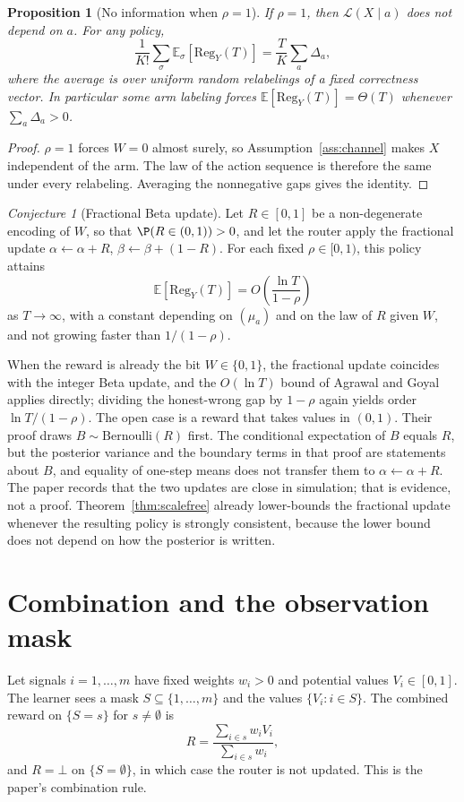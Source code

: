 \documentclass{article}
\newtheorem{proposition}[theorem]{Proposition}
\theoremstyle{definition}
\theoremstyle{remark}
\newtheorem{conjecture}[theorem]{Conjecture}
\newcommand{\E}{\mathbb{E}}
\newcommand{\Reg}{\mathrm{Reg}}
\begin{document}
\begin{proposition}[No information when $\rho=1$]\label{prop:linear}
If $\rho=1$, then $\mathcal L(X\mid a)$ does not depend on $a$. For any policy,
\[
\frac1{K!}\sum_{\sigma}\E_\sigma[\Reg_Y(T)]=\frac{T}{K}\sum_a\Delta_a,
\]
where the average is over uniform random relabelings of a fixed correctness vector. In particular some arm labeling forces $\E[\Reg_Y(T)]=\Theta(T)$ whenever $\sum_a\Delta_a>0$.
\end{proposition}

\begin{proof}
$\rho=1$ forces $W=0$ almost surely, so Assumption~\ref{ass:channel} makes $X$ independent of the arm. The law of the action sequence is therefore the same under every relabeling. Averaging the nonnegative gaps gives the identity.
\end{proof}

\begin{conjecture}[Fractional Beta update]\label{conj:fractional}
Let $R\in[0,1]$ be a non-degenerate encoding of $W$, so that $\P(R\in(0,1))>0$, and let the router apply the fractional update $\alpha\leftarrow\alpha+R$, $\beta\leftarrow\beta+(1-R)$. For each fixed $\rho\in[0,1)$, this policy attains
\[
\E[\Reg_Y(T)]=O\!\left(\frac{\ln T}{1-\rho}\right)
\]
as $T\to\infty$, with a constant depending on $(\mu_a)$ and on the law of $R$ given $W$, and not growing faster than $1/(1-\rho)$.
\end{conjecture}

When the reward is already the bit $W\in\{0,1\}$, the fractional update coincides with the integer Beta update, and the $O(\ln T)$ bound of Agrawal and Goyal~\cite{agrawal2017} applies directly; dividing the honest-wrong gap by $1-\rho$ again yields order $\ln T/(1-\rho)$. The open case is a reward that takes values in $(0,1)$. Their proof draws $B\sim\mathrm{Bernoulli}(R)$ first. The conditional expectation of $B$ equals $R$, but the posterior variance and the boundary terms in that proof are statements about $B$, and equality of one-step means does not transfer them to $\alpha\leftarrow\alpha+R$. The paper records that the two updates are close in simulation; that is evidence, not a proof. Theorem~\ref{thm:scalefree} already lower-bounds the fractional update whenever the resulting policy is strongly consistent, because the lower bound does not depend on how the posterior is written.

\section{Combination and the observation mask}
Let signals $i=1,\dots,m$ have fixed weights $w_i>0$ and potential values $V_i\in[0,1]$. The learner sees a mask $S\subseteq\{1,\dots,m\}$ and the values $\{V_i:i\in S\}$. The combined reward on $\{S=s\}$ for $s\neq\emptyset$ is
\begin{equation}\label{eq:combine}
R=\frac{\sum_{i\in s}w_i V_i}{\sum_{i\in s}w_i},
\end{equation}
and $R=\bot$ on $\{S=\emptyset\}$, in which case the router is not updated. This is the paper's combination rule.
\end{document}
